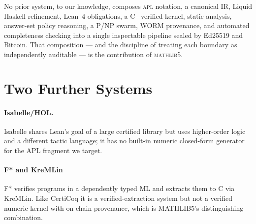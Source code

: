 No prior system, to our knowledge, composes \textsc{apl} notation, a canonical
IR, Liquid Haskell refinement, Lean~4 obligations, a C{--} verified kernel,
static analysis, answer-set policy reasoning, a P/NP swarm, WORM provenance,
and automated completeness checking into a single inspectable pipeline sealed
by Ed25519 and Bitcoin. That composition --- and the discipline of treating
each boundary as independently auditable --- is the contribution of
\textsc{mathlib5}.

\section{Two Further Systems}
\label{sec:rel-further}

\paragraph{Isabelle/HOL.} Isabelle shares Lean's goal of a large certified
library but uses higher-order logic and a different tactic language; it has
no built-in numeric closed-form generator for the APL fragment we target.

\paragraph{F* and KreMLin} F* verifies programs in a dependently typed
ML and extracts them to C via KreMLin. Like CertiCoq it is a
verified-extraction system but not a verified numeric-kernel with on-chain
provenance, which is MATHLIB5's distinguishing combination.
